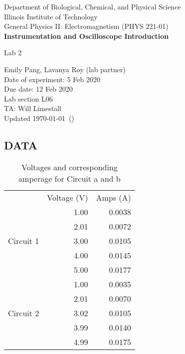 \documentclass [12pt, letterpaper, twoside] {article}
\begin{document}
\begin {titlepage}
\begin {center}
Department of Biological, Chemical, and Physical Science\\
\vspace {0.1cm}
Illinois Institute of Technology\\
\vspace {0.1cm}
General Physics II: Electromagnetism (PHYS 221-01)\\
\vspace* {\fill}
\begingroup
\Large
\textbf {Instrumentation and Oscilloscope Introduction}
\vspace {0.35cm}

\normalsize
Lab 2
\vspace {1.5cm}
\endgroup
\vspace* {\fill}
\end {center}

\vspace*{\fill}
\begin {flushright}
\footnotesize
Emily Pang, Lavanya Roy (lab partner) \\
Date of experiment: 5 Feb 2020 \\
Due date: 12 Feb 2020 \\
Lab section L06 \\
TA: Will Limestall \\
Updated \usdate\today~(\currenttime)
\end {flushright}
\end {titlepage}

\subsection* {DATA}
\begin{table}[h!]
  \centering
  \begin{tabular}{| c | r | r |}
    \hline\hline
    & Voltage (V) & Amps (A) \\
    \cline{2-3}
    \multirow {5}{*}{Circuit 1} & 1.00 & 0.0038 \\
    \cline{2-3}
    & 2.01 & 0.0072 \\
    \cline{2-3}
    & 3.00 & 0.0105 \\
    \cline{2-3}
    & 4.00 & 0.0145 \\
    \cline{2-3}
    & 5.00 & 0.0177 \\
    \hline
    \multirow {5}{*}{Circuit 2} & 1.00 & 0.0035 \\
    \cline{2-3}
    & 2.01 & 0.0070 \\
    \cline{2-3}
    & 3.02 & 0.0105 \\
    \cline{2-3}
    & 3.99 & 0.0140 \\
    \cline{2-3}
    & 4.99 & 0.0175 \\
    \hline\hline
  \end{tabular}
  \caption{Voltages and corresponding amperage for Circuit a and b}
\end{table}
\end{document}
